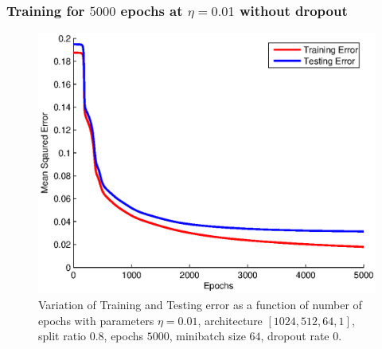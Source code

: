 \documentclass{article}
\newcommand{\myScale}{0.56}
\begin{document}
\subsubsection{Training for $5000$ epochs at $\eta=0.01$ without dropout}
\begin{figure}[H]
\includegraphics[scale=\myScale]{../q2/part1}
\caption{Variation of Training and Testing error as a function of number of epochs with parameters $\eta=0.01$, architecture $[1024,512,64,1]$, split ratio $0.8$, epochs $5000$, minibatch size $64$, dropout rate $0$.}
\label{fig:fig16}
\end{figure}
\end{document}
